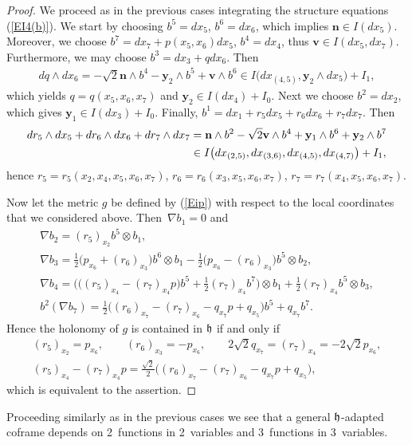 \documentclass[11pt]{article}
\numberwithin{equation}{section}
\newcommand\fh{{\frak h}}
\newcommand\by{{\mathbf y}}
\newcommand\bn{{\mathbf n}}
\newcommand\bv{{\mathbf v}}
\begin{document}
\begin{proof} We proceed as in the previous cases integrating the structure equations (\ref{EI4(b)}). We start by choosing $b^5=dx_5$, $b^6=dx_6$, which implies $\bn\in I(dx_5)$. Moreover, we choose $b^7= dx_7 +p(x_5,x_6)dx_5$, $b^4=dx_4$, thus $\bv\in I(dx_5,dx_7)$. Furthermore, we may choose $b^3= dx_3+qdx_6$. Then
\begin{gather*}dq\wedge dx_6=-\sqrt 2 \bn\wedge b^4 -\by_2\wedge b^5+\bv\wedge b^6 \in I\big(dx_{(4,5)},\by_2\wedge dx_5\big)+I_1, \end{gather*}
which yields $q=q(x_5,x_6,x_7)$ and $\by_2\in I(dx_4)+I_0$. Next we choose $b^2=dx_2$, which gives $\by_1\in I(dx_3)+I_0$. Finally, $b^1= dx_1 + r_5dx_5+r_6dx_6+r_7dx_7$. Then
\begin{gather*}
dr_5\wedge dx_5+dr_6\wedge dx_6+dr_7\wedge dx_7 = \bn\wedge b^2 -\sqrt 2 \bv\wedge b^4+\by_1\wedge b^6+\by_2\wedge b^7\\
\hphantom{dr_5\wedge dx_5+dr_6\wedge dx_6+dr_7\wedge dx_7}{} \in I\big(dx_{(2,5)}, dx_{(3,6)}, dx_{(4,5)}, dx_{(4,7)}\big) +I_1,
\end{gather*}
hence $r_5=r_5(x_2,x_4,x_5,x_6, x_7)$, $r_6=r_6(x_3,x_5,x_6,x_7)$, $r_7=r_7(x_4,x_5,x_6,x_7)$.

Now let the metric $g$ be defined by (\ref{Eip}) with respect to the local coordinates that we considered above. Then~$\nabla b_1=0$ and
\begin{gather*}
\nabla b_2= (r_5)_{x_2} b^5\otimes b_1,\\
\nabla b_3= \tfrac12 \big(p_{x_6}+(r_6)_{x_3}\big)b^6\otimes b_1 - \tfrac12 \big(p_{x_6}-(r_6)_{x_3}\big)b^5\otimes b_2,\\
\nabla b_4= \big( \big((r_5)_{x_4}-(r_7)_{x_4}p\big)b^5+ \tfrac12 (r_7)_{x_4}b^7\big)\otimes b_1 + \tfrac12 (r_7)_{x_4}b^5\otimes b_3,\\
b^2(\nabla b_7)= \tfrac12 \big( (r_6)_{x_7}-(r_7)_{x_6}-q_{x_7}p+q_{x_5}\big)b^5+q_{x_7}b^7.
\end{gather*}
Hence the holonomy of $g$ is contained in $\fh$ if and only if
\begin{gather*}
(r_5)_{x_2}=p_{x_6},\qquad (r_6)_{x_3}=-p_{x_6},\qquad 2\sqrt2 q_{x_7}=(r_7)_{x_4}=-2\sqrt2 p_{x_6},\\
(r_5)_{x_4}-(r_7)_{x_4}p= \tfrac{\sqrt2}2 \big((r_6)_{x_7}-(r_7)_{x_6}-q_{x_7}p+q_{x_5}\big),
\end{gather*}
which is equivalent to the assertion.
\end{proof}
\begin{Remark} Proceeding similarly as in the previous cases we see that a general $\fh$-adapted coframe depends on 2~functions in 2~variables and 3~functions in 3~variables.
\end{Remark}
\end{document}
